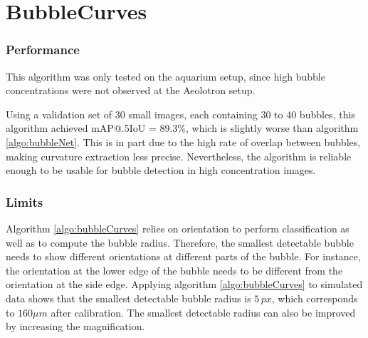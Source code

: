 			\section{BubbleCurves}\label{result_curves}
			
				\subsubsection{Performance}
				This algorithm was only tested on the aquarium setup, since high bubble concentrations were not observed at the Aeolotron setup. 
				
				Using a validation set of 30 small images, each containing 30 to 40 bubbles, this algorithm achieved mAP@.5IoU = 89.3\%, which is slightly worse than algorithm \ref{algo:bubbleNet}. This is in part due to the high rate of overlap between bubbles, making curvature extraction less precise. 
				Nevertheless, the algorithm is reliable enough to be usable for bubble detection in high concentration images.					
				
				\subsubsection{Limits}
				Algorithm \ref{algo:bubbleCurves} relies on orientation to perform classification as well as to compute the bubble radius. Therefore, the smallest detectable bubble needs to show different orientations at different parts of the bubble. For instance, the orientation at the lower edge of the bubble needs to be different from the orientation at the side edge. Applying algorithm \ref{algo:bubbleCurves} to simulated data shows that the smallest detectable bubble radius is $5 \, px$, which corresponds to $160 \mu m$ after calibration. 
				The smallest detectable radius can also be improved by increasing the magnification. 
				
				
				
				
				
				
				
				
				
				
				